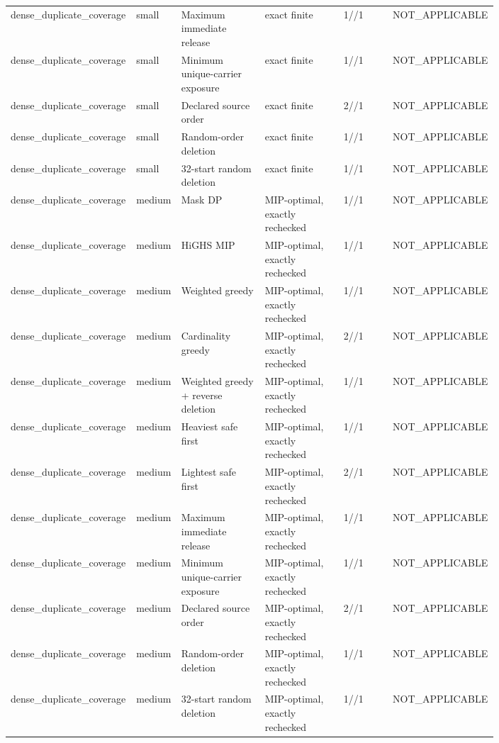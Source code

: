 {\begin{longtable}{p{0.18\linewidth}p{0.07\linewidth}p{0.17\linewidth}p{0.16\linewidth}p{0.10\linewidth}p{0.12\linewidth}}
dense\_duplicate\_coverage & small & Maximum immediate release & exact finite & 1//1 & NOT\_APPLICABLE \\
dense\_duplicate\_coverage & small & Minimum unique-carrier exposure & exact finite & 1//1 & NOT\_APPLICABLE \\
dense\_duplicate\_coverage & small & Declared source order & exact finite & 2//1 & NOT\_APPLICABLE \\
dense\_duplicate\_coverage & small & Random-order deletion & exact finite & 1//1 & NOT\_APPLICABLE \\
dense\_duplicate\_coverage & small & 32-start random deletion & exact finite & 1//1 & NOT\_APPLICABLE \\
dense\_duplicate\_coverage & medium & Mask DP & MIP-optimal, exactly rechecked & 1//1 & NOT\_APPLICABLE \\
dense\_duplicate\_coverage & medium & HiGHS MIP & MIP-optimal, exactly rechecked & 1//1 & NOT\_APPLICABLE \\
dense\_duplicate\_coverage & medium & Weighted greedy & MIP-optimal, exactly rechecked & 1//1 & NOT\_APPLICABLE \\
dense\_duplicate\_coverage & medium & Cardinality greedy & MIP-optimal, exactly rechecked & 2//1 & NOT\_APPLICABLE \\
dense\_duplicate\_coverage & medium & Weighted greedy + reverse deletion & MIP-optimal, exactly rechecked & 1//1 & NOT\_APPLICABLE \\
dense\_duplicate\_coverage & medium & Heaviest safe first & MIP-optimal, exactly rechecked & 1//1 & NOT\_APPLICABLE \\
dense\_duplicate\_coverage & medium & Lightest safe first & MIP-optimal, exactly rechecked & 2//1 & NOT\_APPLICABLE \\
dense\_duplicate\_coverage & medium & Maximum immediate release & MIP-optimal, exactly rechecked & 1//1 & NOT\_APPLICABLE \\
dense\_duplicate\_coverage & medium & Minimum unique-carrier exposure & MIP-optimal, exactly rechecked & 1//1 & NOT\_APPLICABLE \\
dense\_duplicate\_coverage & medium & Declared source order & MIP-optimal, exactly rechecked & 2//1 & NOT\_APPLICABLE \\
dense\_duplicate\_coverage & medium & Random-order deletion & MIP-optimal, exactly rechecked & 1//1 & NOT\_APPLICABLE \\
dense\_duplicate\_coverage & medium & 32-start random deletion & MIP-optimal, exactly rechecked & 1//1 & NOT\_APPLICABLE \\

\end{longtable}}

